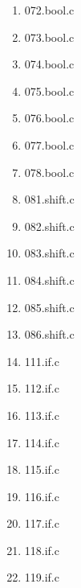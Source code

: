 \begin{multicols}{4}
\begin{enumerate}
        \item 072.bool.c
        \item 073.bool.c
        \item 074.bool.c
        \item 075.bool.c
        \item 076.bool.c
        \item 077.bool.c
        \item 078.bool.c
        \item 081.shift.c
        \item 082.shift.c
        \item 083.shift.c
        \item 084.shift.c
        \item 085.shift.c
        \item 086.shift.c
        \item 111.if.c
        \item 112.if.c
        \item 113.if.c
        \item 114.if.c
        \item 115.if.c
        \item 116.if.c
        \item 117.if.c
        \item 118.if.c
        \item 119.if.c
    \end{enumerate}
\end{multicols} 


